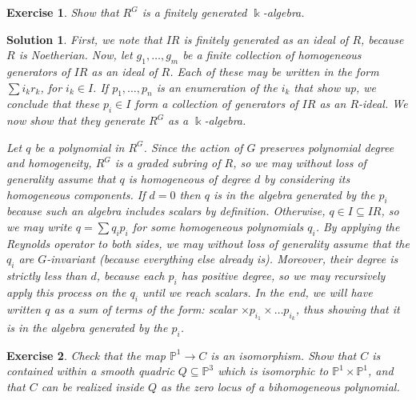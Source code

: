 \documentclass{article}
\newtheorem{ex}{Exercise}
\theoremstyle{nonumberplain}
\newtheorem{sol}{Solution}
\newcommand{\kk}{\Bbbk}
\newcommand{\PP}{\mathbb{P}}
\begin{document}
\begin{ex}
Show that $R^G$ is a finitely generated $\kk$-algebra.
\end{ex}

\begin{sol}
First, we note that $I R$ is finitely generated as an ideal of $R$, because $R$ is Noetherian. Now, let $g_1, \dots, g_m$ be a finite collection of homogeneous generators of $I R$ as an ideal of $R$. Each of these may be written in the form $\sum i_k r_k$, for $i_k \in I$. If $p_1, \dots, p_n$ is an enumeration of the $i_k$ that show up, we conclude that these $p_i \in I$ form a collection of generators of $I R$ as an $R$-ideal. We now show that they generate $R^G$ as a $\kk$-algebra.

Let $q$ be a polynomial in $R^G$. Since the action of $G$ preserves polynomial degree and homogeneity, $R^G$ is a graded subring of $R$, so we may without loss of generality assume that $q$ is homogeneous of degree $d$ by considering its homogeneous components. If $d = 0$ then $q$ is in the algebra generated by the $p_i$ because such an algebra includes scalars by definition. Otherwise, $q \in I \subseteq I R$, so we may write $q = \sum q_i p_i$ for some homogeneous polynomials $q_i$. By applying the Reynolds operator to both sides, we may without loss of generality assume that the $q_i$ are $G$-invariant (because everything else already is). Moreover, their degree is strictly less than $d$, because each $p_i$ has positive degree, so we may recursively apply this process on the $q_i$ until we reach scalars. In the end, we will have written $q$ as a sum of terms of the form: scalar $\times p_{i_1} \times \dots p_{i_k}$, thus showing that it is in the algebra generated by the $p_i$.
\end{sol}

\begin{ex}
Check that the map $\PP^1 \to C$ is an isomorphism. Show that $C$ is contained within a smooth quadric $Q \subseteq \PP^3$ which is isomorphic to $\PP^1 \times \PP^1$, and that $C$ can be realized inside $Q$ as the zero locus of a bihomogeneous polynomial.
\end{ex}
\end{document}

